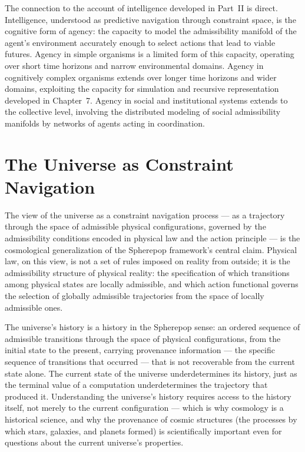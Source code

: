 \documentclass[12pt,openany]{book}
\theoremstyle{plain}
\theoremstyle{definition}
\theoremstyle{remark}
\begin{document}
The connection to the account of intelligence developed in Part~II is direct. Intelligence, understood as predictive navigation through constraint space, is the cognitive form of agency: the capacity to model the admissibility manifold of the agent's environment accurately enough to select actions that lead to viable futures. Agency in simple organisms is a limited form of this capacity, operating over short time horizons and narrow environmental domains. Agency in cognitively complex organisms extends over longer time horizons and wider domains, exploiting the capacity for simulation and recursive representation developed in Chapter~7. Agency in social and institutional systems extends to the collective level, involving the distributed modeling of social admissibility manifolds by networks of agents acting in coordination.

\section{The Universe as Constraint Navigation}

The view of the universe as a constraint navigation process — as a trajectory through the space of admissible physical configurations, governed by the admissibility conditions encoded in physical law and the action principle — is the cosmological generalization of the Spherepop framework's central claim. Physical law, on this view, is not a set of rules imposed on reality from outside; it is the admissibility structure of physical reality: the specification of which transitions among physical states are locally admissible, and which action functional governs the selection of globally admissible trajectories from the space of locally admissible ones.

The universe's history is a history in the Spherepop sense: an ordered sequence of admissible transitions through the space of physical configurations, from the initial state to the present, carrying provenance information — the specific sequence of transitions that occurred — that is not recoverable from the current state alone. The current state of the universe underdetermines its history, just as the terminal value of a computation underdetermines the trajectory that produced it. Understanding the universe's history requires access to the history itself, not merely to the current configuration — which is why cosmology is a historical science, and why the provenance of cosmic structures (the processes by which stars, galaxies, and planets formed) is scientifically important even for questions about the current universe's properties.
\end{document}
